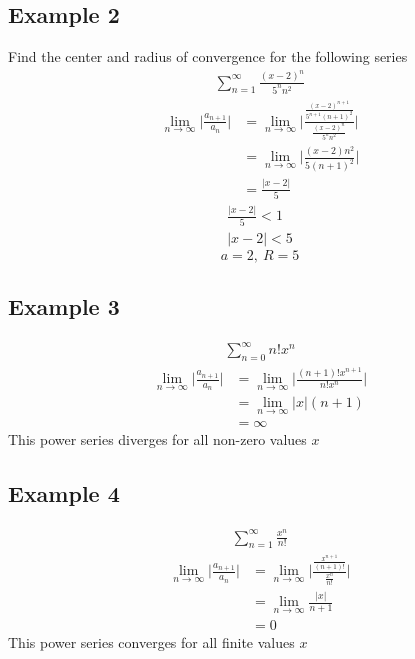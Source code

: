 \documentclass{article}
\theoremstyle{mytheoremstyle}
\theoremstyle{mytheoremstyle}
\theoremstyle{myproblemstyle}
\begin{document}
    \subsection*{Example 2}
    Find the center and radius of convergence for the following series
    \begin{align*}
        \sum_{n=1}^{\infty} \frac{(x-2)^n}{5^nn^2}
    \end{align*}
    \begin{align*}
        \lim_{n\to \infty} \Big| \frac{a_{n+1}}{a_n} \Big|
        &= \lim_{n\to \infty} \bigg|\frac{\frac{(x-2)^{n+1}}{5^{n+1}(n+1)^2}}{\frac{(x-2)^n}{5^nn^2}}\bigg| \\
        &= \lim_{n\to \infty} \Big|\frac{(x-2)n^2}{5(n+1)^2}\Big| \\
        &= \frac{|x-2|}{5}
    \end{align*}
    \begin{align*}
        \frac{|x-2|}{5} < 1 \\
        |x-2| < 5
    \end{align*}
    \[
        a = 2,\ R = 5
    \]

    \subsection*{Example 3}
    \begin{align*}
        \sum_{n=0}^{\infty} n!x^n
    \end{align*}
    \begin{align*}
        \lim_{n\to \infty} \Big|\frac{a_{n+1}}{a_n}\Big|
        &= \lim_{n\to \infty} \Big|\frac{(n+1)!x^{n+1}}{n!x^n}\Big| \\
        &= \lim_{n\to \infty} |x|(n+1) \\
        &= \infty
    \end{align*}
    This power series diverges for all non-zero values $x$

    \subsection*{Example 4}
    \begin{align*}
        \sum_{n=1}^{\infty} \frac{x^n}{n!}
    \end{align*}
    \begin{align*}
        \lim_{n\to \infty} \Big|\frac{a_{n+1}}{a_n}\Big|
        &= \lim_{n\to \infty} \Big|\frac{\frac{x^{n+1}}{(n+1)!}}{\frac{x^n}{n!}}\Big| \\
        &= \lim_{n\to \infty} \frac{|x|}{n+1} \\
        &= 0
    \end{align*}
    This power series converges for all finite values $x$
\end{document}
